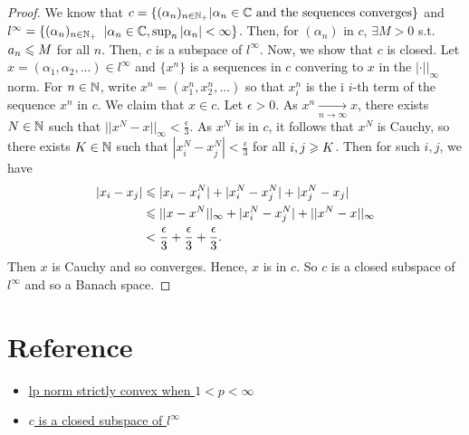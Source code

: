 \begin{proof}
    We know that $c=\{(\alpha_n)_{n\in \mathbb{N}_+}|\alpha_n\in \mathbb{C} \text{ and the sequences converges}\}$ and 
    $l^{\infty}=\{(\alpha_n)_{n\in\mathbb{N}_+}$ $|\alpha_n\in\mathbb{C},\sup_{n} |\alpha_n|<\infty\}$.
    Then, for $(\alpha_n)$ in $c$, $\exists M>0$ s.t. $a_n\leqslant M$ for all $n$.
    Then, $c$ is a subspace of $l^{\infty}$.
    Now, we show that $c$ is closed.
    Let $x=(\alpha_1,\alpha_2,...)\in l^{\infty}$ and $\{x^n\}$ is a sequences in $c$ convering to $x$ in the $|\cdot||_{\infty}$ norm.
    For $n\in \mathbb{N}$, write $x^{n}=(x_1^n,x_2^n,...)$ so that $x_i^n$ is the  i
    $i$-th term of the sequence $x^n$ in $c$. We claim that $x\in c$.
    Let $\epsilon>0$. As $x^n\underset{n\rightarrow \infty}{\longrightarrow} x$, 
    there exists $N\in \mathbb{N}$ such that $||x^{N}-x||_{\infty}<\frac{\epsilon}{3}$.
    As $x^{N}$ is in $c$, it follows that $x^{N}$ is Cauchy, so there exists $K\in \mathbb{N}$
    such that $|x_i^{N}-x_j^{N}|<\frac{\epsilon}{3}$ for all $i,j\geqslant K$. Then for such $i,j$, we have
    \begin{align*}
        |x_i-x_j|&\leqslant |x_i-x_i^{N}|+|x_i^N-x_j^N|+|x_j^N-x_j|\\
                &\leqslant ||x-x^N||_{\infty}+|x_i^N-x_j^N|+||x^{N}-x||_{\infty}\\
                &<\frac{\epsilon}{3} + \frac{\epsilon}{3} + \frac{\epsilon}{3}.
    \end{align*}
    Then $x$ is Cauchy and so converges. Hence, $x$ is in $c$.
    So $c$ is a closed subspace of $l^{\infty}$ and so a Banach space.
\end{proof}

\section{Reference}

\begin{itemize}
    \item \href{https://math.stackexchange.com/questions/80139/why-is-the-l-p-norm-strictly-convex-for-1p-infty}{lp norm strictly convex when $1<p<\infty$}
    \item \href{https://math.stackexchange.com/questions/1258414/proving-that-c-is-a-banach-space?rq=1}{$c$ is a closed subspace of $l^{\infty}$}
\end{itemize}